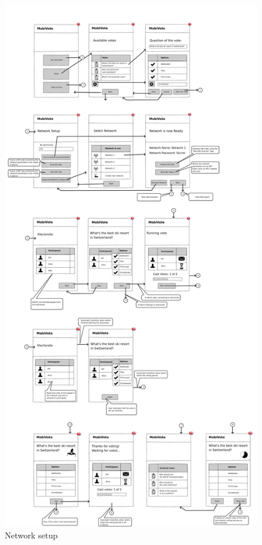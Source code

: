 \documentclass[numbers=noenddot, abstract=on, a4paper, headsepline,
footsepline, oneside, draft=off]{scrreprt}
\begin{document}
\begin{figure}[htb]
	\centering
	\includegraphics[height=.4\textheight]{img/storyboard/network_setup}
	\caption{Network setup}
	\label{fig:network_setup}
\end{figure}
\end{document}
